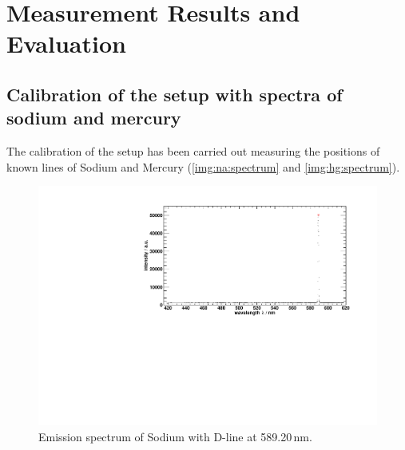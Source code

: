 \section{Measurement Results and Evaluation}

\subsection{Calibration of the setup with spectra of sodium and mercury}
\label{sub:eval:calibration}

The calibration of the setup has been carried out measuring the positions of known lines of Sodium and Mercury
(\autoref{img:na:spectrum} and \autoref{img:hg:spectrum}).

\begin{figure}[H]
\begin{center}
  \includegraphics[width=\textwidth]{../img/NaPeaks.pdf}
  \caption[---]{Emission spectrum of Sodium with D-line at 589.20\,nm.}
  \label{img:na:spectrum}
\end{center}
\end{figure}

